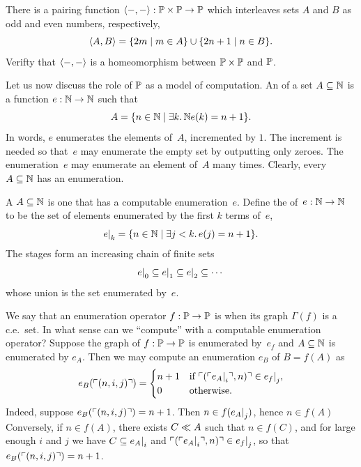 \begin{exercise}
  There is a pairing function $\langle {-}, {-} \rangle : \mathbb{P} \times
  \mathbb{P} \to \mathbb{P}$ which interleaves sets $A$ and $B$ as odd and even
  numbers, respectively,
  \begin{equation*}
    \langle A, B \rangle = \{2 m \mid m \in A\} \cup \{2 n + 1 \mid n \in B\}.
  \end{equation*}
  Verifty that $\langle {-}, {-} \rangle$ is a homeomorphism between $\mathbb{P} \times \mathbb{P}$ and
  $\mathbb{P}$.
\end{exercise}

Let us now discuss the role of $\mathbb{P}$ as a model of computation. An
 of a set $A \subseteq \mathbb{N}$ is a function $e : \mathbb{N}
\to \mathbb{N}$ such that
%
\begin{equation*}
  A = \{n \in \mathbb{N} \mid \exists k .\,{\mathbb{N}}{e(k) = n + 1}\}.
\end{equation*}
%
In words, $e$ enumerates the elements of~$A$, incremented by $1$. The
increment is needed so that~$e$ may enumerate the empty set by
outputting only zeroes. The enumeration~$e$ may enumerate an element of~$A$ many times.
Clearly, every $A \subseteq \mathbb{N}$ has an enumeration.

A  $A \subseteq \mathbb{N}$ is one that has a computable enumeration~$e$.
Define the  of~$e : \mathbb{N} \to \mathbb{N}$ to be the set of elements enumerated by the first $k$ terms
of~$e$,
%
\begin{equation*}
  e{\mid}_{k} = \{n \in \mathbb{N} \mid \exists j < k .\, e(j) = n + 1\}.
\end{equation*}
%
The stages form an increasing chain of finite sets
%
\begin{equation*}
  e{\mid}_{0} \subseteq
  e{\mid}_{1} \subseteq
  e{\mid}_{2} \subseteq
  \cdots
\end{equation*}
%
whose union is the set enumerated by~$e$.

We say that an enumeration operator $f : \mathbb{P} \to \mathbb{P}$ is
 when its graph $\Gamma(f)$ is a c.e.~set. In what
sense can we ``compute'' with a computable enumeration operator?
Suppose the graph of $f : \mathbb{P} \to \mathbb{P}$ is enumerated by~$e_f$
and $A \subseteq \mathbb{N}$ is enumerated by $e_A$. Then we may compute an
enumeration $e_B$ of $B = f(A)$ as
%
\begin{equation*}
  e_B(\ulcorner (n, i, j) \urcorner) =
  \begin{cases}
    n + 1 & \text{if $\ulcorner (\ulcorner e_A{\mid}_{i} \urcorner, n) \urcorner \in
      e_f{\mid}_{j}$,}\\
    0 & \text{otherwise}.
  \end{cases}
\end{equation*}
%
Indeed, suppose $e_B(\ulcorner (n,i,j) \urcorner) = n + 1$. Then $n \in
f(e_A{\mid}_{j})$, hence $n \in f(A)$ Conversely, if $n \in
f(A)$, there exists $C \ll A$ such that $n \in f(C)$, and for large
enough $i$ and $j$ we have $C \subseteq e_A{\mid}_{i}$ and
$\ulcorner (\ulcorner e_A{\mid}_{i} \urcorner, n) \urcorner \in e_f{\mid}_{j}$, so
that $e_B(\ulcorner (n, i, j) \urcorner) = n + 1$.

